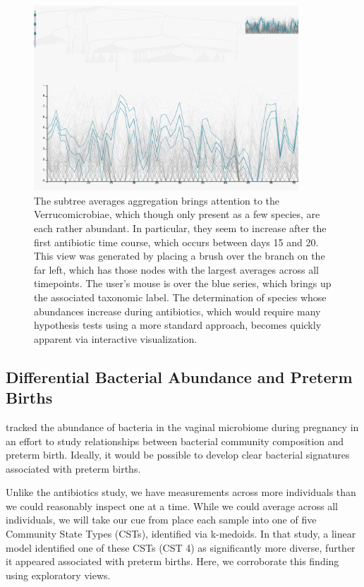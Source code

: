 \documentclass[12pt]{article}
\begin{document}
\begin{figure}

{\centering \includegraphics[width=375px]{figure/verrucomicrobiae}

}

\caption{The subtree averages aggregation brings attention to the
  Verrucomicrobiae, which though only present as a few species, are each rather
  abundant. In particular, they seem to increase after the first antibiotic time
  course, which occurs between days 15 and 20. This view was generated by
  placing a brush over the branch on the far left, which has those nodes with
  the largest averages across all timepoints. The user's mouse is over the blue
  series, which brings up the associated taxonomic label. The determination of
  species whose abundances increase during antibiotics, which would require many
  hypothesis tests using a more standard approach, becomes quickly apparent
  via interactive visualization.}\label{fig:verrucomicrobiae}
\end{figure}

\subsection{Differential Bacterial Abundance and Preterm
Births}\label{differential-bacterial-abundance-and-preterm-births}

\citet{digiulio2015temporal}
tracked the abundance of bacteria in the vaginal microbiome during
pregnancy in an effort to study relationships between bacterial
community composition and preterm birth. Ideally, it would be possible
to develop clear bacterial signatures associated with preterm births.

Unlike the antibiotics study, we have measurements across more
individuals than we could reasonably inspect one at a time. While we
could average across all individuals, we will take our cue from
\citep{digiulio2015temporal}
place each sample into one of five Community State Types (CSTs),
identified via k-medoids. In that study, a linear model identified one
of these CSTs (CST 4) as significantly more diverse, further it appeared
associated with preterm births. Here, we corroborate this finding using
exploratory views.
\end{document}
